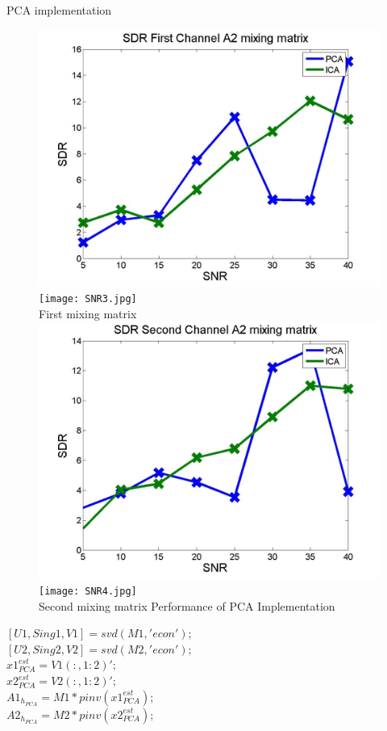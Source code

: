 \documentclass[t,12pt,english
\ifx\beamermode\undefined\else,\beamermode\fi
]{beamer}
\begin{document}
\begin{frame}{PCA implementation}

\begin{figure}[!htbp]
%
\centering
\includegraphics[width=.6\textwidth]{3.jpg}\\
\texttt{[image: SNR3.jpg]}\\
\tiny{First mixing matrix}\label{a3}
\endminipage\hfill
{}%
\centering
\includegraphics[width=.6\textwidth]{4.jpg}\\
\texttt{[image: SNR4.jpg]}\\
\tiny{Second mixing matrix}\label{a4}
\endminipage\hfill
\tiny {Performance of PCA Implementation}
\end{figure}

\tiny{$[U1,Sing1,V1]=svd(M1,'econ');$\\
    $[U2,Sing2,V2]=svd(M2,'econ');$\\
    
    
    $x1^{est}_{PCA}=V1(:,1:2)';$\\
    $x2^{est}_{PCA}=V2(:,1:2)';$\\
    
    $A1_{h}_{PCA}=M1*pinv(x1^{est}_{PCA});$\\
    $A2_{h}_{PCA}=M2*pinv(x2^{est}_{PCA});$\\}
    
 
\end{frame}
\end{document}
